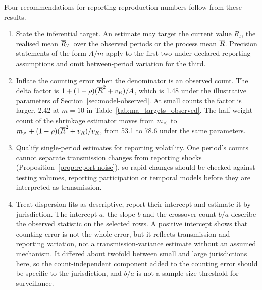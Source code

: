 Four recommendations for reporting reproduction numbers follow from these results.
\begin{enumerate}[leftmargin=*,itemsep=2pt]
\item State the inferential target. An estimate may target the current value $R_t$, the realised mean $\overline{R}_T$ over the observed periods or the process mean $\overline{R}$. Precision statements of the form $A/m$ apply to the first two under declared reporting assumptions and omit between-period variation for the third.
\item Inflate the counting error when the denominator is an observed count. The delta factor is $1+(1-\rho)(\overline{R}^2+v_R)/A$, which is 1.48 under the illustrative parameters of Section~\ref{sec:model-observed}. At small counts the factor is larger, 2.42 at $m=10$ in Table~\ref{tab:ma_targets_observed}. The half-weight count of the shrinkage estimator moves from $m_\times$ to $m_\times+(1-\rho)(\overline{R}^2+v_R)/v_R$, from 53.1 to 78.6 under the same parameters.
\item Qualify single-period estimates for reporting volatility. One period's counts cannot separate transmission changes from reporting shocks (Proposition~\ref{prop:report-noise}), so rapid changes should be checked against testing volumes, reporting participation or temporal models before they are interpreted as transmission.
\item Treat dispersion fits as descriptive, report their intercept and estimate it by jurisdiction. The intercept $a$, the slope $b$ and the crossover count $b/a$ describe the observed statistic on the selected rows. A positive intercept shows that counting error is not the whole error, but it reflects transmission and reporting variation, not a transmission-variance estimate without an assumed mechanism. It differed about twofold between small and large jurisdictions here, so the count-independent component added to the counting error should be specific to the jurisdiction, and $b/a$ is not a sample-size threshold for surveillance.
\end{enumerate}
